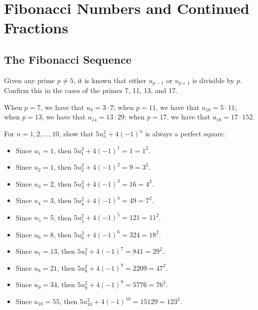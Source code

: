 \chapter{Fibonacci Numbers and Continued Fractions}

\section{The Fibonacci Sequence}

\begin{exercise}
    Given any prime $p \neq 5$, it is known that either $u_{p-1}$ or $u_{p+1}$ is divisible by $p$. Confirm this in the cases of the primes 7, 11, 13, and 17. \\
\end{exercise}

\begin{solution}
    When $p = 7$, we have that $u_8 = 3\cdot 7$; when $p = 11$, we have that $u_{10} = 5\cdot 11$; when $p = 13$, we have that $u_{14} = 13\cdot 29$; when $p = 17$, we have that $u_{18} = 17\cdot 152$. \\
\end{solution}

\begin{exercise}
    For $n = 1,2,..., 10$, show that $5u_n^2 + 4(-1)^n$ is always a perfect square. \\
\end{exercise}

\begin{solution}
    \begin{itemize}
        \item Since $u_1 = 1$, then $5u_1^2 + 4(-1)^1 = 1 = 1^2$.
        \item Since $u_2 = 1$, then $5u_2^2 + 4(-1)^2 = 9 = 3^2$.
        \item Since $u_3 = 2$, then $5u_3^2 + 4(-1)^3 = 16 = 4^2$.
        \item Since $u_4 = 3$, then $5u_4^2 + 4(-1)^4 = 49 = 7^2$.
        \item Since $u_5 = 5$, then $5u_5^2 + 4(-1)^5 = 121 = 11^2$.
        \item Since $u_6 = 8$, then $5u_6^2 + 4(-1)^6 = 324 = 18^2$.
        \item Since $u_7 = 13$, then $5u_7^2 + 4(-1)^7 = 841 = 29^2$.
        \item Since $u_8 = 21$, then $5u_8^2 + 4(-1)^8 = 2209 = 47^2$.
        \item Since $u_9 = 34$, then $5u_9^2 + 4(-1)^9 = 5776 = 76^2$.
        \item Since $u_{10} = 55$, then $5u_{10}^2 + 4(-1)^{10} = 15129 = 123^2$.\\
    \end{itemize}
\end{solution}

